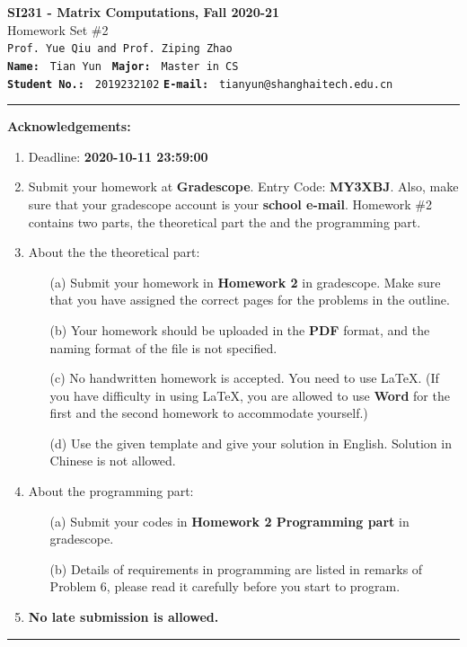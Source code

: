 \documentclass[english,onecolumn]{IEEEtran}
\begin{document}
\begin{center}
	\textbf{{\Large SI231 - Matrix Computations, Fall 2020-21}}\\
	Homework Set \#2\\
   \texttt{Prof. Yue Qiu and Prof. Ziping Zhao} \\
	\texttt{\textbf{Name:}}   	\texttt{ Tian Yun }  		\hspace{1bp}
	\texttt{\textbf{Major:}}  	\texttt{ Master in CS } 	\\
	\texttt{\textbf{Student No.:}} 	\texttt{ 2019232102}     \hspace{1bp}
	\texttt{\textbf{E-mail:}} 	\texttt{ tianyun@shanghaitech.edu.cn}
\par\end{center}


\noindent
\rule{\linewidth}{0.4pt}
{\bf {\large Acknowledgements:}}
\begin{enumerate}
    \item Deadline: \textbf{2020-10-11 23:59:00}
    \item Submit your homework at \textbf{Gradescope}. Entry Code: \textbf{MY3XBJ}. Also, make sure that your gradescope account is your \textbf{school e-mail}.
    Homework \#2 contains two parts, the theoretical part the and the programming part.
    \item About the the theoretical part:
    \begin{enumerate}
            \item[(a)] Submit your homework in \textbf{Homework 2} in gradescope. Make sure that you have assigned the correct pages for the problems in the outline.
            \item[(b)] Your homework should be uploaded in the \textbf{PDF} format, and the naming format of the file is not specified.
            \item[(c)] No handwritten homework is accepted. You need to use \LaTeX. (If you have difficulty in using \LaTeX, you are allowed to use \textbf{Word} for the first and the second homework to accommodate yourself.)
            \item[(d)] Use the given template and give your solution in English. Solution in Chinese is not allowed. 
        \end{enumerate}
  \item About the programming part:
  \begin{enumerate}
      \item[(a)] Submit your codes in \textbf{Homework 2 Programming part} in gradescope.
      \item[(b)] Details of requirements in programming are listed in remarks of Problem 6, please read it carefully before you start to program.
  \end{enumerate}
  \item \textbf{No late submission is allowed.}
\end{enumerate}
\rule{\linewidth}{0.4pt}
\newpage 
\end{document}
